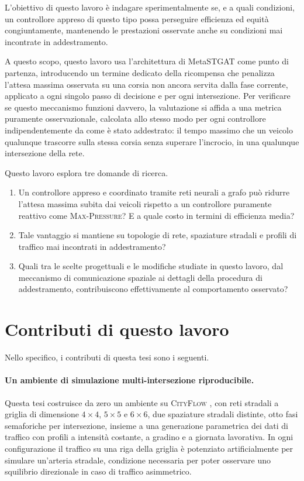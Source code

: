 L'obiettivo di questo lavoro è indagare sperimentalmente se, e a quali
condizioni, un controllore appreso di questo tipo possa perseguire
efficienza ed equità congiuntamente, mantenendo le prestazioni osservate
anche su condizioni mai incontrate in addestramento.

A questo scopo, questo lavoro usa l'architettura di MetaSTGAT come punto
di partenza, introducendo un termine dedicato della ricompensa che
penalizza l'attesa massima osservata su una corsia non ancora servita
dalla fase corrente, applicato a ogni singolo passo di decisione e per
ogni intersezione. Per verificare se questo meccanismo funzioni davvero,
la valutazione si affida a una metrica puramente osservazionale,
calcolata allo stesso modo per ogni controllore indipendentemente da come
è stato addestrato: il tempo massimo che un veicolo qualunque trascorre
sulla stessa corsia senza superare l'incrocio, in una qualunque
intersezione della rete.

Questo lavoro esplora tre domande di ricerca.
\begin{enumerate}
    \item Un controllore appreso e coordinato tramite reti neurali a grafo
          può ridurre l'attesa massima subita dai veicoli rispetto a un
          controllore puramente reattivo come \textsc{Max-Pressure}? E a
          quale costo in termini di efficienza media?
    \item Tale vantaggio si mantiene su topologie di rete, spaziature
          stradali e profili di traffico mai incontrati in addestramento?
    \item Quali tra le scelte progettuali e le modifiche studiate in
          questo lavoro, dal meccanismo di comunicazione spaziale ai
          dettagli della procedura di addestramento, contribuiscono
          effettivamente al comportamento osservato?
\end{enumerate}

\section{Contributi di questo lavoro}

Nello specifico, i contributi di questa tesi sono i seguenti.

\paragraph{Un ambiente di simulazione multi-intersezione riproducibile.}
Questa tesi costruisce da zero un ambiente su \textsc{CityFlow}
\citep{zhang2019cityflow}, con reti stradali a griglia di dimensione
$4\times4$, $5\times5$ e $6\times6$, due spaziature stradali distinte,
otto fasi semaforiche per intersezione, insieme a una
generazione parametrica dei dati di traffico con profili a intensità
costante, a gradino e a giornata lavorativa. In ogni configurazione il
traffico su una riga della griglia è potenziato artificialmente per
simulare un'arteria stradale, condizione necessaria per poter osservare
uno squilibrio direzionale in caso di traffico asimmetrico.

